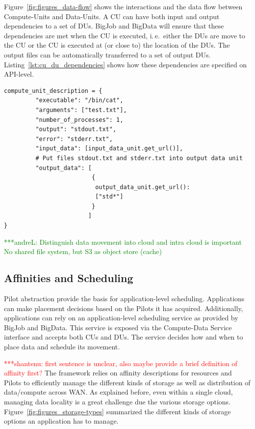 \documentclass[times]{cpeauth}
\newcommand{\jhanote}[1]{ {\textcolor{red} { ***shantenu: #1 }}}
\newcommand{\alnote}[1]{ {\textcolor{green} { ***andreL: #1 }}}
\newcommand{\alnote}[1]{}
\newcommand{\jhanote}[1]{}
\newcommand{\pilot}{Pilot\xspace}
\newcommand{\pilots}{Pilots\xspace}
\newcommand{\computedataservice}{Compute-Data Service\xspace}
\newcommand{\computeunit}{Compute-Unit\xspace}
\newcommand{\computeunits}{Compute-Units\xspace}
\newcommand{\dataunit}{Data-Unit\xspace}
\newcommand{\dataunits}{Data-Units\xspace}
\newcommand{\dus}{DUs\xspace}
\newcommand{\cu}{CU\xspace}
\newcommand{\cus}{CUs\xspace}
\begin{document}
Figure~\ref{fig:figures_data-flow} shows the interactions and the data
flow between \computeunits and \dataunits. A \cu can have both input
and output dependencies to a set of \dus. BigJob and BigData will
ensure that these dependencies are met when the \cu is executed,
i.\,e.\ either the \dus are move to the \cu or the \cu is executed at
(or close to) the location of the \dus. The output files can be
automatically transferred to a set of output
\dus. Listing~\ref{lst:cu_du_dependencies} shows how these
dependencies are specified on API-level.

\begin{lstlisting}[caption={{Managing \dataunit/\computeunit Dependencies}}, style=myPythonListing, label={lst:cu_du_dependencies}, float=t]
compute_unit_description = {
         "executable": "/bin/cat",
         "arguments": ["test.txt"],
         "number_of_processes": 1,
         "output": "stdout.txt",
         "error": "stderr.txt",   
         "input_data": [input_data_unit.get_url()],
         # Put files stdout.txt and stderr.txt into output data unit
         "output_data": [
                         {
                          output_data_unit.get_url(): 
                          ["std*"]
                         }
                        ]    
}
\end{lstlisting}


\alnote{
Distinguish data movement into cloud and intra cloud is important
No shared file system, but S3 as object store (cache)
}


\subsection{Affinities and Scheduling}

\pilot abstraction provide the basis for application-level scheduling.
Applications can make placement decisions based on the \pilots it has
acquired. Additionally, applications can rely on an application-level
scheduling service as provided by BigJob and BigData. This service is exposed
via the \computedataservice interface and accepts both \cus and \dus. The
service decides how and when to place data and schedule its movement.

\jhanote{first sentence is unclear, also maybe provide a brief
  definition of affinity first?} The framework relies on affinity
descriptions for resources and \pilots to efficiently manage the
different kinds of storage as well as distribution of data/compute
across WAN. As explained before, even within a single cloud, managing
data locality is a great challenge due the various storage options.
Figure~\ref{fig:figures_storage-types} summarized the different kinds
of storage options an application has to manage.
\end{document}

